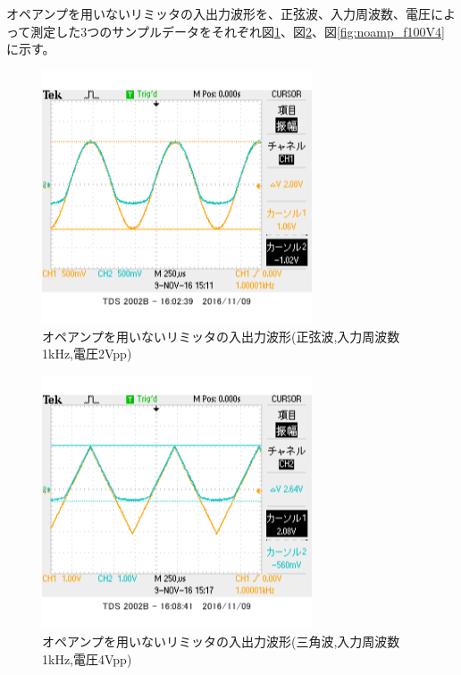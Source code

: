 \documentclass[11pt,a4j]{jsarticle}
\begin{document}
    オペアンプを用いないリミッタの入出力波形を、正弦波、入力周波数、電圧によって測定した3つのサンプルデータをそれぞれ図\ref{fig:noamp_f1V2}、図\ref{fig:noamp_sankaku}、図\ref{fig:noamp_f100V4}に示す。
    
    
    \begin{figure}[htbp]
  \centering
  \includegraphics[width=8cm,clip]{1_1_noampFG_f1V2_ViVo.png}
  \caption{オペアンプを用いないリミッタの入出力波形(正弦波,入力周波数1kHz,電圧2Vpp)}
  \label{fig:noamp_f1V2}
 \end{figure}%
 
 \begin{figure}[htbp]
  \centering
  \includegraphics[width=8cm,clip]{1_1_noampFG_f1V4sankaku_ViVo.png}
  \caption{オペアンプを用いないリミッタの入出力波形(三角波,入力周波数1kHz,電圧4Vpp)}
  \label{fig:noamp_sankaku}
 \end{figure}%
 
\end{document}
